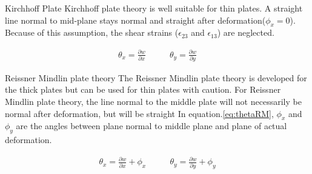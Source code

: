 \documentclass[9pt]{beamer}
\begin{document}
\begin{frame}
\begin{block}{Kirchhoff Plate}
 Kirchhoff plate theory is well suitable for thin plates. A straight line normal to mid-plane stays normal and straight after deformation($\phi_x=0$).  Because of this assumption, the shear strains ($\epsilon_{23}$ and $ \epsilon_{13}$)  are neglected.


\begin{align}
\theta_x  = \frac{\partial w }{\partial x}  \quad & \quad
\theta_y  = \frac{\partial w }{\partial y} 
\end{align}

\end{block}

\begin{block}{Reissner Mindlin plate theory}
The Reissner Mindlin plate theory is developed for the thick plates but can be used for thin plates with caution.  For Reissner Mindlin plate theory, the line normal to the middle plate will not necessarily be normal after deformation, but will be straight In equation.\ref{eq:thetaRM}, $\phi_x$ and $\phi_y$ are the angles between plane normal to middle plane and plane of actual deformation.  

\begin{align}\label{eq:thetaRM}
\theta_x  = \frac{\partial w }{\partial x} + \phi_x \quad & \quad
\theta_y  = \frac{\partial w }{\partial y} + \phi_y
\end{align}
\end{block}
\end{frame}
\end{document}
